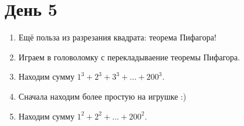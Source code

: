 \documentclass[a4paper, 12pt]{article}
\begin{document}
  \section{День 5}



  \begin{enumerate}
    \item Ещё польза из разрезания квадрата: теорема Пифагора!
    \item Играем в головоломку с перекладываение теоремы Пифагора.
    \item Находим сумму $1^3 + 2^3 + 3^3 + \ldots + 200^3$.
    \item Сначала находим более простую на игрушке :)
    \item Находим сумму $1^2 + 2^2 + \ldots + 200^2$.
  \end{enumerate}
\end{document}
